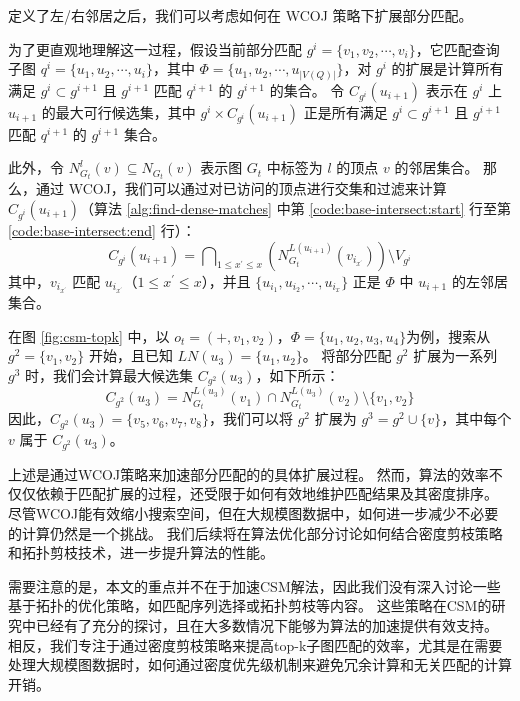 定义了左/右邻居之后，我们可以考虑如何在 WCOJ 策略下扩展部分匹配。

为了更直观地理解这一过程，假设当前部分匹配 $g^i = \{v_1, v_2, \cdots, v_i\}$，它匹配查询子图 $q^i = \{u_1, u_2, \cdots, u_i\}$，其中 $\Phi = \{u_1, u_2, \cdots, u_{|V(Q)|}\}$，对 $g^i$ 的扩展是计算所有满足 $g^i \subset g^{i+1}$ 且 $g^{i+1}$ 匹配 $q^{i+1}$ 的 $g^{i+1}$ 的集合。
令 $C_{g^{i}}(u_{i+1})$ 表示在 $g^i$ 上 $u_{i+1}$ 的最大可行候选集，其中 $g^i \times C_{g^{i}}(u_{i+1})$ 正是所有满足 $g^i \subset g^{i+1}$ 且 $g^{i+1}$ 匹配 $q^{i+1}$ 的 $g^{i+1}$ 集合。

此外，令 $N_{G_t}^l(v) \subseteq N_{G_t}(v)$ 表示图 $G_t$ 中标签为 $l$ 的顶点 $v$ 的邻居集合。
那么，通过 WCOJ，我们可以通过对已访问的顶点进行交集和过滤来计算 $C_{g^{i}}(u_{i+1})$（算法 \ref{alg:find-dense-matches} 中第 \ref{code:base-intersect:start} 行至第 \ref{code:base-intersect:end} 行）：
\begin{equation} \label{equation:wcoj-intersection}
    C_{g^{i}}(u_{i+1}) = \bigcap\nolimits_{1\leq x^\prime\leq x} \left(  N_{G_t}^{L(u_{i+1})}(v_{i_{x^\prime}}) \right)  \setminus V_{g^i}
\end{equation}
其中，$v_{i_{x^\prime}}$ 匹配 $u_{i_{x^\prime}}$（$1 \leq x^\prime \leq x$），并且 $\{u_{i_1}, u_{i_2}, \cdots, u_{i_x}\}$ 正是 $\Phi$ 中 $u_{i+1}$ 的左邻居集合。

在图 \ref{fig:csm-topk} 中，以 $o_t = (+,v_1,v_2)$，$\Phi = \{u_1,u_2,u_3,u_4\}$为例，搜索从 $g^2 = \{v_1,v_2\}$ 开始，且已知 $LN(u_3) = \{u_1, u_2\}$。
将部分匹配 $g^2$ 扩展为一系列 $g^3$ 时，我们会计算最大候选集 $C_{g^{2}}(u_3)$，如下所示：
\[
	C_{g^{2}}(u_{3}) =  N_{G_t}^{L(u_{3})}(v_{1})\cap N_{G_t}^{L(u_{3})}(v_{2})  \setminus \{v_1, v_2\}
\]
因此，$C_{g^{2}}(u_3) = \{v_5, v_6, v_7, v_8\}$，我们可以将 $g^2$ 扩展为 $g^3 = g^2 \cup \{v\}$，其中每个 $v$ 属于 $C_{g^{2}}(u_3)$。

上述是通过WCOJ策略来加速部分匹配的的具体扩展过程。
然而，算法的效率不仅仅依赖于匹配扩展的过程，还受限于如何有效地维护匹配结果及其密度排序。
尽管WCOJ能有效缩小搜索空间，但在大规模图数据中，如何进一步减少不必要的计算仍然是一个挑战。
我们后续将在算法优化部分讨论如何结合密度剪枝策略和拓扑剪枝技术，进一步提升算法的性能。

需要注意的是，本文的重点并不在于加速CSM解法，因此我们没有深入讨论一些基于拓扑的优化策略，如匹配序列选择或拓扑剪枝等内容。
这些策略在CSM的研究中已经有了充分的探讨，且在大多数情况下能够为算法的加速提供有效支持。
相反，我们专注于通过密度剪枝策略来提高top-k子图匹配的效率，尤其是在需要处理大规模图数据时，如何通过密度优先级机制来避免冗余计算和无关匹配的计算开销。




